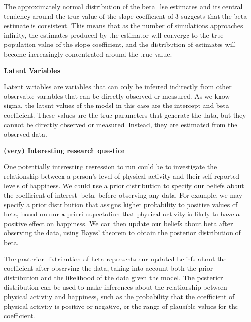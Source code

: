 \documentclass{article}
\begin{document}
The approximately normal distribution of the beta\_lse estimates and its
central tendency around the true value of the slope coefficient of 3
suggests that the beta estimate is consistent. This means that as the
number of simulations approaches infinity, the estimates produced by the
estimator will converge to the true population value of the slope
coefficient, and the distribution of estimates will become increasingly
concentrated around the true value.
\vspace{2em}



\begin{center}
\textbf{Latent Variables}
\end{center}
\vspace{2em}

Latent variables are variables that can only be inferred indirectly from
other observable variables that can be directly observed or measured. 
As we know sigma, the latent values of the model in this case are the intercept and beta coefficient. These values are the true parameters that generate the data,
but they cannot be directly observed or measured. Instead, they are
estimated from the observed data.
\vspace{2em}


\begin{center}
\textbf{(very) Interesting research question}
\end{center}
\vspace{2em}

One potentially interesting regression to run could be to investigate
the relationship between a person's level of physical activity and their
self-reported levels of happiness. We could use a prior distribution to
specify our beliefs about the coefficient of interest, beta, before
observing any data. For example, we may specify a prior distribution
that assigns higher probability to positive values of beta, based on our
a priori expectation that physical activity is likely to have a positive
effect on happiness. We can then update our beliefs about beta after
observing the data, using Bayes' theorem to obtain the posterior
distribution of beta.

The posterior distribution of beta represents our updated beliefs about
the coefficient after observing the data, taking into account both the
prior distribution and the likelihood of the data given the model. The
posterior distribution can be used to make inferences about the
relationship between physical activity and happiness, such as the
probability that the coefficient of physical activity is positive or
negative, or the range of plausible values for the coefficient.
\end{document}
